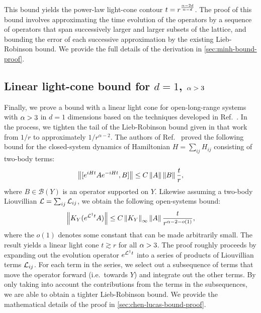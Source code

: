 This bound yields the power-law light-cone contour $t = r^{\frac{\alpha-2d}{\alpha-d}}$.
The proof of this bound involves approximating the time evolution of the operators by a sequence of operators that  span successively larger and larger subsets of the lattice, and bounding the error of each successive approximation  by the existing Lieb-Robinson bound.
We provide the full details of the derivation in \cref{sec:minh-bound-proof}.

\subsection{Linear light-cone bound for $d=1$, $\alpha > 3$}
\label{sec:chen-lucas-bound}
Finally, we prove a bound with a linear light cone for open-long-range systems with $\alpha > 3$ in $d=1$ dimensions based on the techniques developed in Ref.~\cite{Chen2019}.
In the process, we tighten the tail of the Lieb-Robinson bound given in that work from $1/r$ to approximately $1/r^{\alpha-2}$.
The authors of Ref.~\cite{Chen2019} proved the following bound for the closed-system dynamics of Hamiltonian $H = \sum_{ij} H_{ij}$ consisting of two-body terms:
\begin{align}
\label{eq:chen-lucas-closed-bound}
	\left\| [e^{iHt} A e^{-iHt},B]\right\| \leq C \left\|A\right\| \left\|B\right\| \frac{t}{r},
\end{align}
where $B \in \mathcal{B}(Y)$ is an operator supported on $Y$.
Likewise assuming a two-body Liouvillian $\mathcal{L} = \sum_{ij} \mathcal{L}_{ij}$, we obtain the following open-systems bound:
\begin{align}
\label{eq:chen-lucas-open-bound}
	\left\|  K_Y(e^{\mathcal{L}^\dagger t} A)\right\| \leq C \left\|K_Y\right\|_{\infty} \left\|A\right\| \frac{t}{r^{\alpha-2-o(1)}},
\end{align}
where the $o(1)$ denotes some constant that can be made arbitrarily small.
The result yields a linear light cone $t \gtrsim r$ for all $\alpha > 3$.
The proof roughly proceeds by expanding out the evolution operator $e^{\mathcal{L}^\dagger t}$ into a series of products of Liouvillian terms $\mathcal{L}_{ij}$.
For each term in the series, we select out a subsequence of terms that move the operator forward (i.e.~towards $Y$) and integrate out the other terms.
By only taking into account the contributions from the terms in the subsequences,  we are able to obtain a tighter Lieb-Robinson bound.
We provide the mathematical details of the proof in \cref{sec:chen-lucas-bound-proof}.

